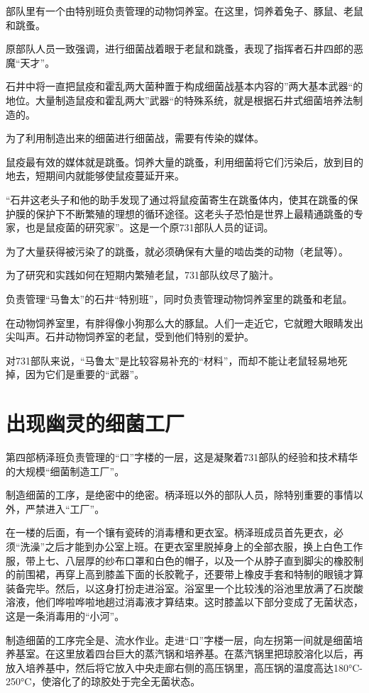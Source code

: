 \documentclass[a4paper,12pt,UTF8,twoside]{ctexbook}
\begin{document}
部队里有一个由特别班负责管理的动物饲养室。在这里，饲养着兔子、豚鼠、老鼠和跳蚤。

原部队人员一致强调，进行细菌战着眼于老鼠和跳蚤，表现了指挥者石井四郎的恶魔“天才”。

石井中将一直把鼠疫和霍乱两大菌种置于构成细菌战基本内容的”两大基本武器“的地位。大量制造鼠疫和霍乱两大”武器“的特殊系统，就是根据石井式细菌培养法制造的。

为了利用制造出来的细菌进行细菌战，需要有传染的媒体。

鼠疫最有效的媒体就是跳蚤。饲养大量的跳蚤，利用细菌将它们污染后，放到目的地去，短期间内就能够使鼠疫蔓延开来。

“石井这老头子和他的助手发现了通过将鼠疫菌寄生在跳蚤体内，使其在跳蚤的保护膜的保护下不断繁殖的理想的循环途径。这老头子恐怕是世界上最精通跳蚤的专家，也是鼠疫菌的研究家”。这是一个原731部队人员的证词。

为了大量获得被污染了的跳蚤，就必须确保有大量的啮齿类的动物（老鼠等）。

为了研究和实践如何在短期内繁殖老鼠，731部队纹尽了脑汁。

负责管理“马鲁太”的石井“特别班”，同时负责管理动物饲养室里的跳蚤和老鼠。

在动物饲养室里，有胖得像小狗那么大的豚鼠。人们一走近它，它就瞪大眼睛发出尖叫声。石井动物饲养室的老鼠，受到他们特别的爱护。

对731部队来说，“马鲁太”是比较容易补充的“材料”，而却不能让老鼠轻易地死掉，因为它们是重要的“武器”。

\section{出现幽灵的细菌工厂}

第四部柄泽班负责管理的“口”字楼的一层，这是凝聚着731部队的经验和技术精华的大规模“细菌制造工厂”。

制造细菌的工序，是绝密中的绝密。柄泽班以外的部队人员，除特别重要的事情以外，严禁进入“工厂”。

在一楼的后面，有一个镶有瓷砖的消毒槽和更衣室。柄泽班成员首先更衣，必须“洗澡”之后才能到办公室上班。在更衣室里脱掉身上的全部衣服，换上白色工作服，带上七、八层厚的纱布口罩和白色的帽子，以及一个从脖子直到脚尖的橡胶制的前围裙，再穿上高到膝盖下面的长胶靴子，还要带上橡皮手套和特制的眼镜才算装备完毕。然后，以这身打扮走进浴室。浴室里一个比较浅的浴池里放满了石炭酸溶液，他们哗啦哗啦地趟过消毒液才算结束。这时膝盖以下部分变成了无菌状态，这是一条消毒用的“小河”。

制造细菌的工序完全是、流水作业。走进“口”字楼一层，向左拐第一间就是细菌培养基室。在这里放着四台巨大的蒸汽锅和培养基。在蒸汽锅里把琼胶溶化以后，再放入培养基中，然后将它放入中央走廊右侧的高压锅里，高压锅的温度高达180°C-250°C，使溶化了的琼胶处于完全无菌状态。
\end{document}
